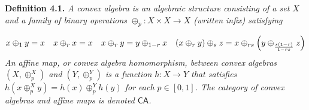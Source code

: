 \par\medskip
\hypertarget{html:S4.Thmtheorem1}{} \par\noindent\textbf{\textbf{Definition 4.1}\textbf{.}}\quad  %
\hypertarget{html:S4.Thmtheorem1.p1}{} \emph{A \emph{convex algebra} is an algebraic structure consisting of a set %
\hypertarget{html:S4.Thmtheorem1.p1.m1}{}\({X}\) and a family of binary operations %
\hypertarget{html:S4.Thmtheorem1.p1.m2}{}\({\oplus_{p}\colon X\times X\to X}\) (written infix) satisfying}
\par\medskip
\hypertarget{html:S8.EGx5}{} %
\hypertarget{html:S4.Ex2}{}  %
\hypertarget{html:S4.Ex2.m1}{}\[\displaystyle x\oplus_{1}y=x\quad x\oplus_{r}x=x\quad x\oplus_{r}y=y\oplus_{1-r}x\quad(x\oplus_{r}y)\oplus_{s}z=x\oplus_{rs}\Big{(}y\oplus_{\frac{s(1-r)}{1-rs}}z\Big{)}\]    \emph{An \emph{affine map}, or \emph{convex algebra homomorphism}, between convex algebras %
\hypertarget{html:S4.Thmtheorem1.p1.m3}{}\({(X,\oplus^{X}_{p})}\) and %
\hypertarget{html:S4.Thmtheorem1.p1.m4}{}\({(Y,\oplus^{Y}_{p})}\) is a function %
\hypertarget{html:S4.Thmtheorem1.p1.m5}{}\({h\colon X\to Y}\) that satisfies %
\hypertarget{html:S4.Thmtheorem1.p1.m6}{}\({h(x\oplus^{X}_{p}y)=h(x)\oplus^{Y}_{p}h(y)}\) for each %
\hypertarget{html:S4.Thmtheorem1.p1.m7}{}\({p\in[0,1]}\). The category of convex algebras and affine maps is denoted %
\hypertarget{html:S4.Thmtheorem1.p1.m8}{}\({\mathsf{CA}}\).}
\par\medskip
